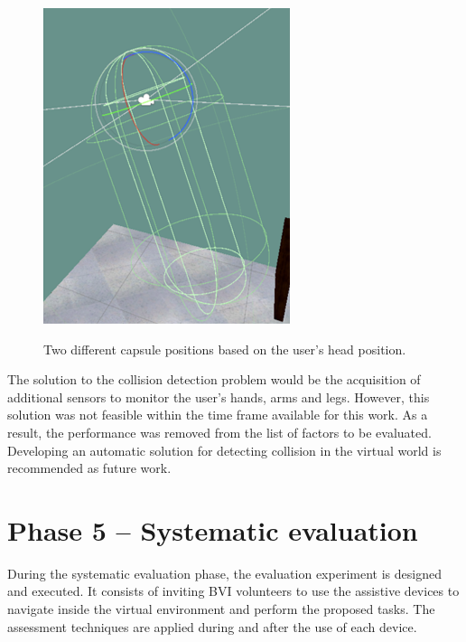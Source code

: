 \begin{figure}[!htb]
\begin{minipage}{0.45\textwidth}
                \includegraphics[width = 0.8\linewidth]{Metodologia/envelope2.png}
                \label{fig:user_looking_down}
            \end{minipage}
            \caption{Two different capsule positions based on the user's head position.}
            \label{fig:user_envelope}
        \end{figure}

        The solution to the collision detection problem would be the acquisition of additional sensors to monitor the user's hands, arms and legs. However, this solution was not feasible within the time frame available for this work. As a result, the performance was removed from the list of factors to be evaluated. Developing an automatic solution for detecting collision in the virtual world is recommended as future work.

\section{Phase 5 – Systematic evaluation}
\label{sec:experiment}
        
During the systematic evaluation phase, the evaluation experiment is designed and executed. It consists of inviting BVI volunteers to use the assistive devices to navigate inside the virtual environment and perform the proposed tasks. The assessment techniques are applied during and after the use of each device.

